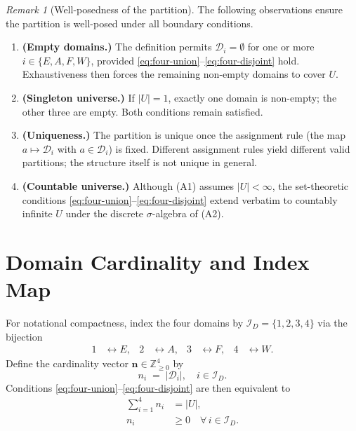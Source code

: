 \documentclass[12pt,openany]{book}
\newcommand{\calU}{\mathcal{U}}
\numberwithin{equation}{chapter}
\theoremstyle{plain}
\theoremstyle{definition}
\theoremstyle{remark}
\newtheorem{remark}[theorem]{Remark}
\numberwithin{equation}{chapter}
\theoremstyle{plain}
\def\calU{U}%
\begin{document}
\begin{remark}[Well-posedness of the partition]
\label{rem:partition-wp}
The following observations ensure the partition is well-posed under all
boundary conditions.
\begin{enumerate}
  \item \textbf{(Empty domains.)}
        The definition permits $\mathcal{D}_i = \emptyset$ for one or
        more $i \in \{E,A,F,W\}$, provided
        \eqref{eq:four-union}--\eqref{eq:four-disjoint} hold.
        Exhaustiveness then forces the remaining non-empty domains to
        cover $\calU$.

  \item \textbf{(Singleton universe.)}
        If $|\calU| = 1$, exactly one domain is non-empty; the other
        three are empty.  Both conditions remain satisfied.

  \item \textbf{(Uniqueness.)}
        The partition is unique once the assignment rule (the map
        $a \mapsto \mathcal{D}_i$ with $a \in \mathcal{D}_i$) is fixed.
        Different assignment rules yield different valid partitions;
        the structure itself is not unique in general.

  \item \textbf{(Countable universe.)}
        Although (A1) assumes $|\calU| < \infty$, the set-theoretic
        conditions \eqref{eq:four-union}--\eqref{eq:four-disjoint}
        extend verbatim to countably infinite $\calU$ under the discrete
        $\sigma$-algebra of (A2).
\end{enumerate}
\end{remark}

\section{Domain Cardinality and Index Map}
\label{sec:domain-cardinality}

\noindent For notational compactness, index the four domains by
$\mathcal{I}_D = \{1,2,3,4\}$ via the bijection
\begin{align}
  1 &\leftrightarrow E, &
  2 &\leftrightarrow A, &
  3 &\leftrightarrow F, &
  4 &\leftrightarrow W.
  \label{eq:domain-index}
\end{align}
Define the cardinality vector $\mathbf{n} \in \mathbb{Z}_{\geq 0}^{4}$ by
\begin{equation}
  n_i \;=\; |\mathcal{D}_i|, \quad i \in \mathcal{I}_D.
  \label{eq:card-vec}
\end{equation}
Conditions \eqref{eq:four-union}--\eqref{eq:four-disjoint} are then
equivalent to
\begin{align}
  \sum_{i=1}^{4} n_i &= |\calU|,
  \label{eq:card-sum} \\
  n_i &\geq 0 \quad \forall\, i \in \mathcal{I}_D.
  \label{eq:card-nonneg}
\end{align}
\end{document}
